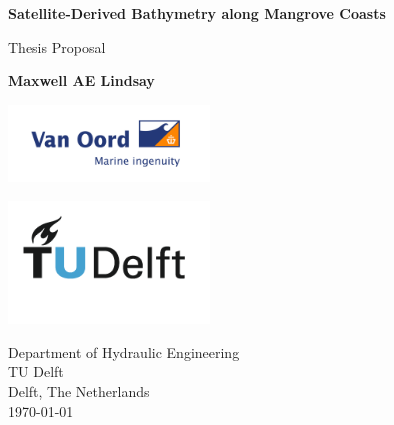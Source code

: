 \begin{titlepage}

  \begin{center}
    \vspace*{1cm}
    \color{black}
    \Huge
    \textbf{Satellite-Derived Bathymetry along Mangrove Coasts}
    
    \vspace{0.5cm}
    Thesis Proposal
    
    \vspace{1.5cm}
    \Large
    \textbf{Maxwell AE Lindsay}
    
    \large
    \vfill
    
    
    \vspace{0.8cm}
    
    \includegraphics[width=0.4\textwidth]{figures/VanOord-2048x785.png}
    
    \includegraphics[width=0.4\textwidth]{figures/TU_P1_full-color.png}
    
    Department of Hydraulic Engineering\\
    TU Delft\\
    Delft, The Netherlands\\
    \today
    
  \end{center}
\end{titlepage}